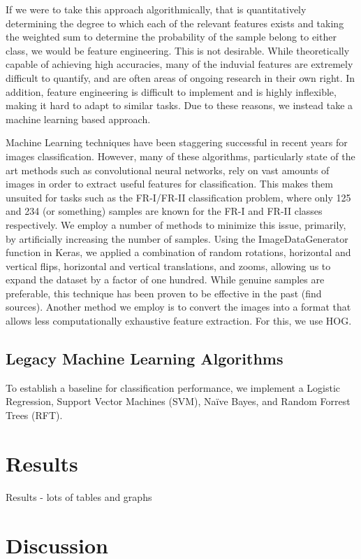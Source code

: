 \documentclass[%
 aip,
 jmp,%
 amsmath,amssymb,
 reprint,%
]{revtex4-1}
\begin{document}
If we were to take this approach algorithmically, that is quantitatively determining the degree to which each of the relevant features exists and taking the weighted sum to determine the probability of the sample belong to either class, we would be feature engineering. This is not desirable. While theoretically capable of achieving high accuracies, many of the induvial features are extremely difficult to quantify, and are often areas of ongoing research in their own right. In addition, feature engineering is difficult to implement and is highly inflexible, making it hard to adapt to similar tasks. Due to these reasons, we instead take a machine learning based approach. 

Machine Learning techniques have been staggering successful in recent years for images classification. However, many of these algorithms, particularly state of the art methods such as convolutional neural networks, rely on vast amounts of images in order to extract useful features for classification. This makes them unsuited for tasks such as the FR-I/FR-II classification problem, where only 125 and 234 (or something) samples are known for the FR-I and FR-II classes respectively. We employ a number of methods to minimize this issue, primarily, by artificially increasing the number of samples. Using the ImageDataGenerator function in Keras, we applied a combination of random rotations, horizontal and vertical flips, horizontal and vertical translations, and zooms, allowing us to expand the dataset by a factor of one hundred. While genuine samples are preferable, this technique has been proven to be effective in the past (find sources).  Another method we employ is to convert the images into a format that allows less computationally exhaustive feature extraction. For this, we use HOG. 

\subsection{\label{sec:level2}Legacy Machine Learning Algorithms}
To establish a baseline for classification performance, we implement a Logistic Regression, Support Vector Machines (SVM), Naïve Bayes, and Random Forrest Trees (RFT).


\section{Results}

Results - lots of tables and graphs


\section{Discussion}
\end{document}

